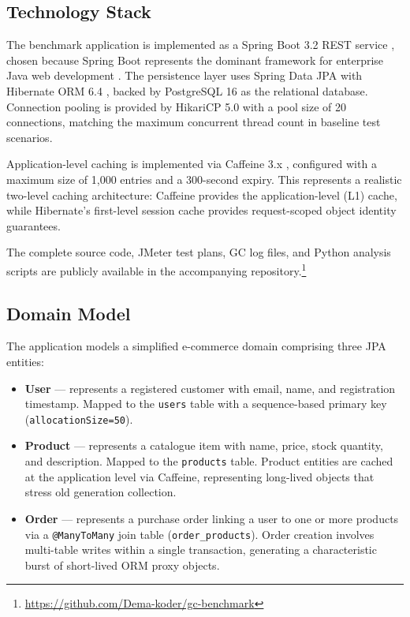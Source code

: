 \subsection{Technology Stack}
\label{subsec:tech-stack}

The benchmark application is implemented as a Spring Boot 3.2 REST service \cite{springboot2024}, chosen because Spring Boot represents the dominant framework for enterprise Java web development \cite{stackoverflow2025survey}. The persistence layer uses Spring Data JPA with Hibernate ORM 6.4 \cite{hibernate2024}, backed by PostgreSQL 16 \cite{postgresql2024} as the relational database. Connection pooling is provided by HikariCP 5.0 \cite{hikaricp2024} with a pool size of 20 connections, matching the maximum concurrent thread count in baseline test scenarios.

Application-level caching is implemented via Caffeine 3.x \cite{caffeine2024}, configured with a maximum size of 1,000 entries and a 300-second expiry. This represents a realistic two-level caching architecture: Caffeine provides the application-level (L1) cache, while Hibernate's first-level session cache provides request-scoped object identity guarantees.

The complete source code, JMeter test plans, GC log files, and Python analysis scripts are publicly available in the accompanying repository.\footnote{\url{https://github.com/Dema-koder/gc-benchmark}}

\subsection{Domain Model}
\label{subsec:domain-model}

The application models a simplified e-commerce domain comprising three JPA entities:

\begin{itemize}
    \item \textbf{User} --- represents a registered customer with email, name, and registration timestamp. Mapped to the \texttt{users} table with a sequence-based primary key (\texttt{allocationSize=50}).
    \item \textbf{Product} --- represents a catalogue item with name, price, stock quantity, and description. Mapped to the \texttt{products} table. Product entities are cached at the application level via Caffeine, representing long-lived objects that stress old generation collection.
    \item \textbf{Order} --- represents a purchase order linking a user to one or more products via a \texttt{@ManyToMany} join table (\texttt{order\_products}). Order creation involves multi-table writes within a single transaction, generating a characteristic burst of short-lived ORM proxy objects.
\end{itemize}

